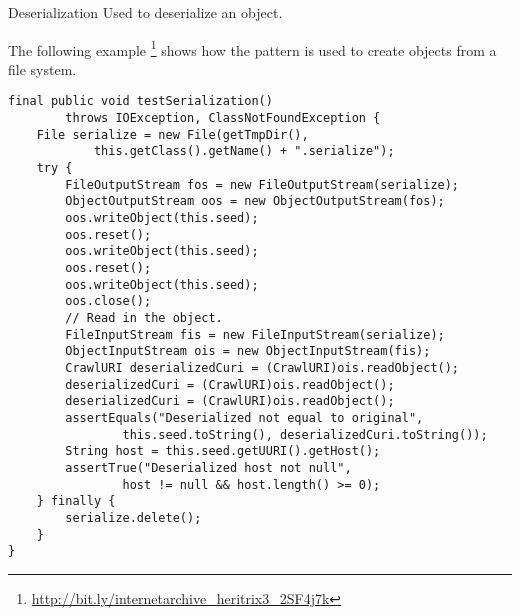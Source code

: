 \begin{pattern}{Deserialization}
Used to deserialize an object.

\instances{}
The following example%
\footnote{\url{http://bit.ly/internetarchive_heritrix3_2SF4j7k}}
shows how the \thisp{} pattern is used to create objects from a file system.

\begin{verbatim}
final public void testSerialization()
        throws IOException, ClassNotFoundException {
    File serialize = new File(getTmpDir(),
            this.getClass().getName() + ".serialize");
    try {
        FileOutputStream fos = new FileOutputStream(serialize);
        ObjectOutputStream oos = new ObjectOutputStream(fos);
        oos.writeObject(this.seed);
        oos.reset();
        oos.writeObject(this.seed);
        oos.reset();
        oos.writeObject(this.seed);
        oos.close();
        // Read in the object.
        FileInputStream fis = new FileInputStream(serialize);
        ObjectInputStream ois = new ObjectInputStream(fis);
        CrawlURI deserializedCuri = (CrawlURI)ois.readObject();
        deserializedCuri = (CrawlURI)ois.readObject();
        deserializedCuri = (CrawlURI)ois.readObject();
        assertEquals("Deserialized not equal to original",
                this.seed.toString(), deserializedCuri.toString());
        String host = this.seed.getUURI().getHost();
        assertTrue("Deserialized host not null",
                host != null && host.length() >= 0);
    } finally {
        serialize.delete();
    }
}
\end{verbatim}

\detection{}

\discussion{}

\related{}

\end{pattern}
